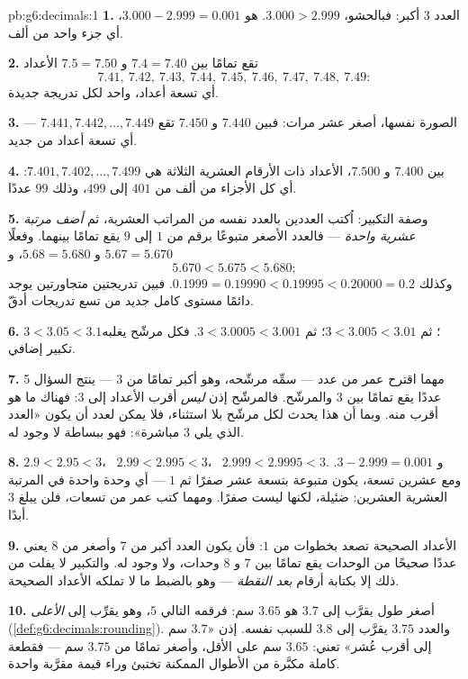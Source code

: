 \begin{solution}{pb:g6:decimals:1}
\textbf{1.} العدد $3$ أكبر: فبالحشو، $3.000 > 2.999$. 
هو $3.000 - 2.999 = 0.001$، أي جزء واحد من ألف.

\textbf{2.} تقع تمامًا بين $7.4 = 7.40$ و $7.5 = 7.50$ الأعداد
\[
7.41,\ 7.42,\ 7.43,\ 7.44,\ 7.45,\ 7.46,\ 7.47,\ 7.48,\ 7.49 :
\]
أي تسعة أعداد، واحد لكل تدريجة جديدة.

\textbf{3.} الصورة نفسها، أصغر عشر مرات: فبين $7.440$
و $7.450$ تقع $7.441, 7.442, \dots, 7.449$ --- أي تسعة أعداد
من جديد.

\textbf{4.} بين $7.400$ و $7.500$، الأعداد ذات الأرقام العشرية
الثلاثة هي $7.401, 7.402, \dots, 7.499$: أي كل
الأجزاء من ألف من $401$ إلى $499$، وذلك $99$ عددًا.

\textbf{5.} وصفة التكبير: اُكتب العددين بالعدد نفسه من
المراتب العشرية، ثم \emph{أضف مرتبة عشرية واحدة}
--- فالعدد الأصغر متبوعًا برقم من $1$ إلى $9$ يقع
تمامًا بينهما. وفعلًا $5.67 = 5.670$ و
$5.68 = 5.680$، و
\[
5.670 < 5.675 < 5.680 ;
\]
وكذلك $0.1999 = 0.19990 < 0.19995 < 0.20000 = 0.2$. فبين
تدريجتين متجاورتين يوجد دائمًا مستوى كامل جديد من
تسع تدريجات أدقّ.

\textbf{6.} $3 < 3.05 < 3.1$؛ ثم $3 < 3.005 < 3.01$؛ ثم
$3 < 3.0005 < 3.001$. فكل مرشّح يغلبه تكبير إضافي.

\textbf{7.} مهما اقترح عمر من عدد --- سمِّه
مرشّحه، وهو أكبر تمامًا من $3$ --- ينتج السؤال 5
عددًا يقع تمامًا بين $3$ والمرشّح. فالمرشّح إذن
\emph{ليس} أقرب الأعداد إلى $3$: فهناك ما هو أقرب
منه. وبما أن هذا يحدث لكل مرشّح بلا استثناء،
فلا يمكن لعدد أن يكون «العدد الذي يلي $3$ مباشرة»: فهو ببساطة
لا وجود له.

\textbf{8.} $2.9 < 2.95 < 3$، \ $2.99 < 2.995 < 3$، \
$2.999 < 2.9995 < 3$. و $3 - 2.999 = 0.001$. ومع عشرين
تسعة، يكون   متبوعة بتسعة عشر
صفرًا ثم $1$ --- أي وحدة واحدة في المرتبة العشرية العشرين:
ضئيلة، لكنها ليست صفرًا. ومهما كتب عمر من تسعات، فلن
يبلغ $3$ أبدًا.

\textbf{9.} الأعداد الصحيحة تصعد بخطوات من $1$: فأن يكون العدد أكبر من $7$
وأصغر من $8$ يعني عددًا صحيحًا من الوحدات يقع تمامًا
بين $7$ و $8$ وحدات، ولا وجود له. والتكبير لا يفلت من
ذلك إلا بكتابة أرقام \emph{بعد النقطة} --- وهو بالضبط
ما لا تملكه الأعداد الصحيحة.

\textbf{10.} أصغر طول يقرَّب إلى $3.7$ هو $3.65$ سم:
فرقمه التالي $5$، وهو يقرِّب إلى \emph{الأعلى}
(\cref{def:g6:decimals:rounding}). والعدد $3.75$ يقرَّب إلى $3.8$
للسبب نفسه. إذن «$3.7$ سم إلى أقرب عُشر» تعني:
$3.65$ سم على الأقل، وأصغر تمامًا من $3.75$ سم --- فقطعة
كاملة مكبَّرة من الأطوال الممكنة تختبئ وراء قيمة
مقرَّبة واحدة.


\end{solution}
